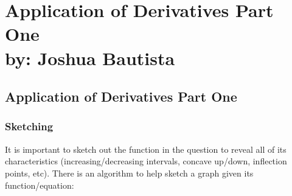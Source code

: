 \documentclass[12pt,fleqn]{book} %
\begin{document}
\part{Application of Derivatives Part One\\ by: Joshua Bautista}


\pagebreak

\chapter{Application of Derivatives Part One}

\vspace*{-50mm}

\section{Sketching}

\vspace*{-70mm}

It is important to sketch out the function in the question to reveal all of its characteristics (increasing/decreasing intervals, concave up/down, inflection points, etc).
There is an algorithm to help sketch a graph given its function/equation:

\vspace*{-35mm}
\end{document}
